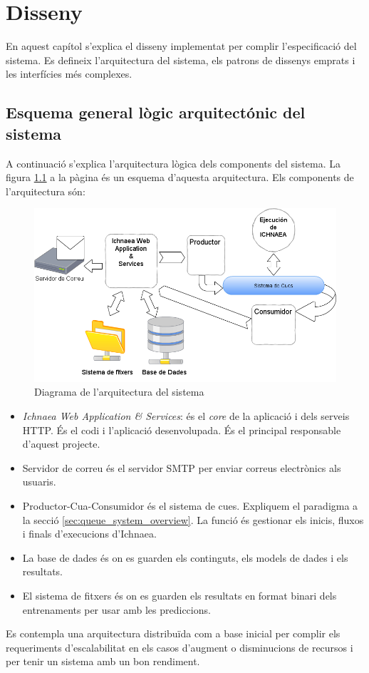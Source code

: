 \chapter{Disseny}
\label{cha:dessign}

En aquest cap\'{i}tol s'explica el disseny implementat per complir l'especificació del sistema. Es defineix l'arquitectura del sistema, els patrons de dissenys emprats i les interfícies m\'{e}s complexes. 

\section{Esquema general l\`{o}gic arquitect\'{o}nic del sistema}
A continuació s'explica l'arquitectura lògica dels components del sistema. La figura \ref{fig:archsoftware} a la p\`{a}gina \pageref{fig:archsoftware} \'{e}s un esquema d'aquesta arquitectura. Els components de l'arquitectura s\'{o}n:\\

\begin{figure}[h!]
  \includegraphics[scale=0.5]{img/design/ArchitectureSoftware.png}
  \caption{Diagrama de l'arquitectura del sistema}
  \label{fig:archsoftware}
\end{figure}

\begin{itemize}
\item \textit{Ichnaea Web Application \& Services}: \'{e}s el \textit{core} de la aplicaci\'{o} i dels serveis HTTP. \'{E}s el codi i l'aplicació desenvolupada. \'{E}s el principal responsable d'aquest projecte.
\item Servidor de correu \'{e}s el servidor SMTP per enviar correus electr\`{o}nics als usuaris.
\item Productor-Cua-Consumidor \'{e}s el sistema de cues. Expliquem el paradigma a la secció \ref{sec:queue_system_overview}. La funci\'{o} \'{e}s gestionar els inicis, fluxos i finals d'execucions d'Ichnaea.
\item La base de dades \'{e}s on es guarden els continguts, els models de dades i els resultats.
\item El sistema de fitxers \'{e}s on es guarden els resultats en format binari dels entrenaments per usar amb les prediccions.
\end{itemize}
Es contempla una arquitectura distribuïda com a base inicial per complir els requeriments d'escalabilitat en els casos d'augment o disminucions de recursos i per tenir un sistema amb un bon rendiment.\\

